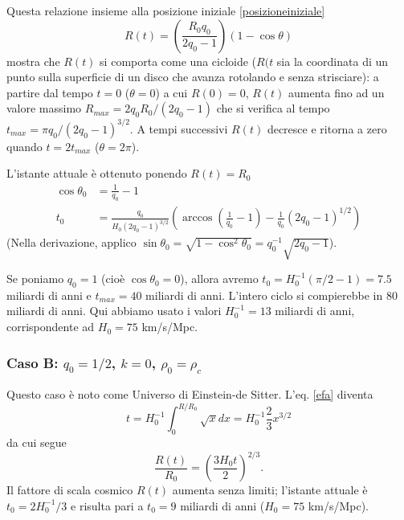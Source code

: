 Questa relazione insieme alla posizione iniziale \eqref{posizioneiniziale}
\begin{equation}
  R(t)= \left( \frac {R_0 q_0} {2q_0-1} \right) (1-\cos \theta)
\end{equation}
mostra che $R(t)$ si comporta come una cicloide ($R(t$ sia la coordinata di un
punto sulla superficie di un disco che avanza rotolando e senza strisciare): a
partire dal tempo $t=0$ ($\theta=0$) a cui $R(0)=0$, $R(t)$ aumenta fino ad un
valore massimo $R_{max}= {2 q_0 R_0 }/({2q_0-1})$ che si verifica al tempo
$t_{max}= \pi q_0/(2q_0-1)^{3/2}$.  A tempi successivi $R(t)$ decresce e ritorna
a zero quando $t=2t_{max}$ ($\theta =2 \pi$).

L'istante attuale è ottenuto ponendo $R(t)=R_0$
\begin{subequations}
  \begin{align}
    \cos\theta_0 &= \frac {1} {q_0} -1 \\
    t_0 &= \frac {q_0}{H_0 (2q_0-1)^{3/2}} \left(\arccos(\frac {1}{q_0}-1) -
          \frac {1}{q_0}(2q_0-1)^{1/2} \right)
  \end{align}
\end{subequations}
(Nella derivazione, applico $\sin \theta_0= \sqrt{1-\cos^2\theta_0}=
{q_0^{-1}\sqrt{2q_0-1}}$).

Se poniamo $q_0=1$ (cioè $\cos \theta_0=0$), allora avremo $t_0 = H_0^{-1} (\pi
/2-1) = 7.5$ miliardi di anni e $t_{max} = 40$ miliardi di anni.  L'intero ciclo
si compierebbe in $80$ miliardi di anni.  Qui abbiamo usato i valori $H_0^{-1} =
13$ miliardi di anni, corrispondente ad
$H_0 = 75$ km/s/Mpc.

\subsubsection{Caso B: $q_0 = 1/2$, $k=0$, $\rho_0= \rho_c$}

Questo caso è noto come Universo di Einstein-de Sitter.  L'eq. \eqref{efa}
diventa
\begin{equation}
  t = H_0^{-1} \int_0^{R/R_0} \sqrt x dx = H_0^{-1} \frac{2} {3} x^{3/2}
\end{equation}
da cui segue
\begin{equation}
  \frac{R(t)}{R_0} = \left( \frac {3H_0 t}{2} \right)^{2/3}.
\end{equation}
Il fattore di scala cosmico $R(t)$ aumenta senza limiti; l'istante attuale è
$t_0=2H_0^{-1}/3$ e risulta pari a $t_0= 9$ miliardi di anni ($H_0= 75$
km/s/Mpc).

